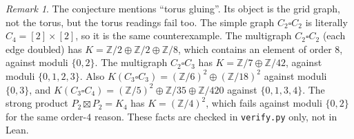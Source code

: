 \documentclass[11pt]{article}
\theoremstyle{definition}
\theoremstyle{remark}
\newtheorem{remark}[theorem]{Remark}
\newcommand{\Z}{\mathbb{Z}}
\begin{document}
\begin{remark}
The conjecture mentions ``torus gluing''. Its object is the grid graph, not
the torus, but the torus readings fail too. The simple graph $C_2\square C_2$
is literally $C_4=[2]\times[2]$, so it is the same counterexample. The
multigraph $C_2\square C_2$ (each edge doubled) has
$K=\Z/2\oplus\Z/2\oplus\Z/8$, which contains an element of order $8$, against
moduli $\{0,2\}$. The multigraph $C_2\square C_3$ has $K=\Z/7\oplus\Z/42$, against
moduli $\{0,1,2,3\}$. Also $K(C_3\square C_3)=(\Z/6)^2\oplus(\Z/18)^2$ against
moduli $\{0,3\}$, and $K(C_3\square C_4)=(\Z/5)^2\oplus\Z/35\oplus\Z/420$ against
$\{0,1,3,4\}$. The strong product $P_2\boxtimes P_2=K_4$ has
$K=(\Z/4)^2$, which fails against moduli $\{0,2\}$ for the same order-$4$ reason.
These facts are checked in \texttt{verify.py} only, not in Lean.
\end{remark}
\end{document}
